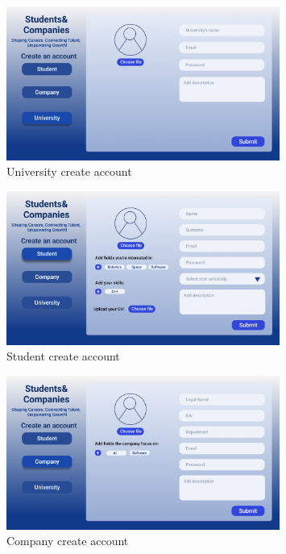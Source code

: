 \begin{figure}[H]
    \centering
    \includegraphics[width=0.8\textwidth]{Images/UI/Create account University.png}
    \caption{University create account}\label{fig:Creat_account University}
\end{figure}

\begin{figure}[H]
    \centering
    \includegraphics[width=0.8\textwidth]{Images/UI/Create account student.png}
    \caption{Student create account}\label{fig:Creat_account student}
\end{figure}

\begin{figure}[H]
    \centering
    \includegraphics[width=0.8\textwidth]{Images/UI/Create account company.png}
    \caption{Company create account}\label{fig:Creat_account company}
\end{figure}

